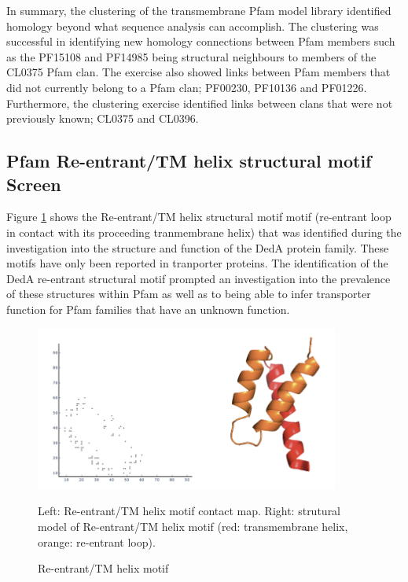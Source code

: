 In summary, the clustering of the transmembrane Pfam model library identified homology beyond what sequence analysis can accomplish.  The clustering was successful in identifying new homology connections between Pfam members such as the PF15108 and PF14985 being structural neighbours to members of the CL0375 Pfam clan.  The exercise also showed links between Pfam members that did not currently belong to a Pfam clan;  PF00230, PF10136 and PF01226.  Furthermore, the clustering exercise identified links between clans that were not previously known; CL0375 and CL0396.  


\subsection{Pfam Re-entrant/TM helix structural motif Screen}

Figure \ref{fig:rent_loop} shows the Re-entrant/TM helix structural motif motif (re-entrant loop in contact with its proceeding tranmembrane helix) that was identified during the investigation into the structure and function of the DedA protein family.  These motifs have only been reported in tranporter proteins.  The identification of the DedA re-entrant structural motif prompted an investigation into the prevalence of these structures within Pfam \cite{El-Gebali2019} as well as to being able to infer transporter function for Pfam families that have an unknown function.

\begin{figure}[th!]
    \centering
    \includegraphics[width=100mm, scale=0.99]{Pfam/rent_loop.png}
    \caption{Re-entrant/TM helix motif}
    \label{fig:rent_loop}
    \small
    \begin{flushleft}
Left: Re-entrant/TM helix motif contact map. Right: strutural model of Re-entrant/TM helix motif (red: transmembrane helix, orange: re-entrant loop).\end{flushleft}

\end{figure}

